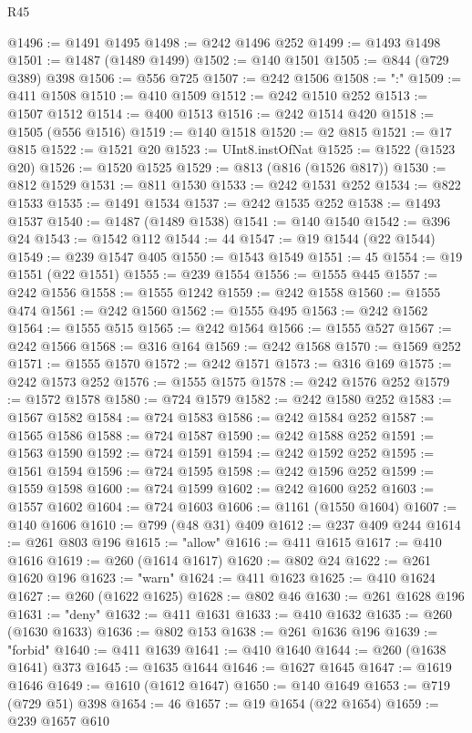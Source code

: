 \begin{lexlean}{R45}
\begin{coremodule}
@1496 := @1491 @1495
@1498 := @242 @1496 @252
@1499 := @1493 @1498
@1501 := @1487 (@1489 @1499)
@1502 := @140 @1501
@1505 := @844 (@729 @389) @398
@1506 := @556 @725
@1507 := @242 @1506
@1508 := ":"
@1509 := @411 @1508
@1510 := @410 @1509
@1512 := @242 @1510 @252
@1513 := @1507 @1512
@1514 := @400 @1513
@1516 := @242 @1514 @420
@1518 := @1505 (@556 @1516)
@1519 := @140 @1518
@1520 := @2 @815
@1521 := @17 @815
@1522 := @1521 @20
@1523 := UInt8.instOfNat
@1525 := @1522 (@1523 @20)
@1526 := @1520 @1525
@1529 := @813 (@816 (@1526 @817))
@1530 := @812 @1529
@1531 := @811 @1530
@1533 := @242 @1531 @252
@1534 := @822 @1533
@1535 := @1491 @1534
@1537 := @242 @1535 @252
@1538 := @1493 @1537
@1540 := @1487 (@1489 @1538)
@1541 := @140 @1540
@1542 := @396 @24
@1543 := @1542 @112
@1544 := 44
@1547 := @19 @1544 (@22 @1544)
@1549 := @239 @1547 @405
@1550 := @1543 @1549
@1551 := 45
@1554 := @19 @1551 (@22 @1551)
@1555 := @239 @1554
@1556 := @1555 @445
@1557 := @242 @1556
@1558 := @1555 @1242
@1559 := @242 @1558
@1560 := @1555 @474
@1561 := @242 @1560
@1562 := @1555 @495
@1563 := @242 @1562
@1564 := @1555 @515
@1565 := @242 @1564
@1566 := @1555 @527
@1567 := @242 @1566
@1568 := @316 @164
@1569 := @242 @1568
@1570 := @1569 @252
@1571 := @1555 @1570
@1572 := @242 @1571
@1573 := @316 @169
@1575 := @242 @1573 @252
@1576 := @1555 @1575
@1578 := @242 @1576 @252
@1579 := @1572 @1578
@1580 := @724 @1579
@1582 := @242 @1580 @252
@1583 := @1567 @1582
@1584 := @724 @1583
@1586 := @242 @1584 @252
@1587 := @1565 @1586
@1588 := @724 @1587
@1590 := @242 @1588 @252
@1591 := @1563 @1590
@1592 := @724 @1591
@1594 := @242 @1592 @252
@1595 := @1561 @1594
@1596 := @724 @1595
@1598 := @242 @1596 @252
@1599 := @1559 @1598
@1600 := @724 @1599
@1602 := @242 @1600 @252
@1603 := @1557 @1602
@1604 := @724 @1603
@1606 := @1161 (@1550 @1604)
@1607 := @140 @1606
@1610 := @799 (@48 @31) @409
@1612 := @237 @409 @244
@1614 := @261 @803 @196
@1615 := "allow"
@1616 := @411 @1615
@1617 := @410 @1616
@1619 := @260 (@1614 @1617)
@1620 := @802 @24
@1622 := @261 @1620 @196
@1623 := "warn"
@1624 := @411 @1623
@1625 := @410 @1624
@1627 := @260 (@1622 @1625)
@1628 := @802 @46
@1630 := @261 @1628 @196
@1631 := "deny"
@1632 := @411 @1631
@1633 := @410 @1632
@1635 := @260 (@1630 @1633)
@1636 := @802 @153
@1638 := @261 @1636 @196
@1639 := "forbid"
@1640 := @411 @1639
@1641 := @410 @1640
@1644 := @260 (@1638 @1641) @373
@1645 := @1635 @1644
@1646 := @1627 @1645
@1647 := @1619 @1646
@1649 := @1610 (@1612 @1647)
@1650 := @140 @1649
@1653 := @719 (@729 @51) @398
@1654 := 46
@1657 := @19 @1654 (@22 @1654)
@1659 := @239 @1657 @610

\end{coremodule}
\end{lexlean}
